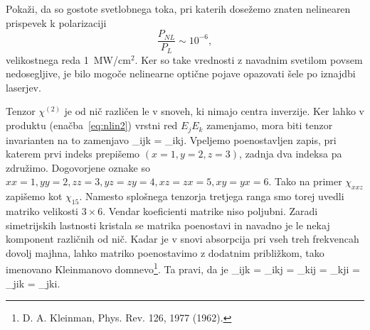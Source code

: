 \begin{definition}
Pokaži, da so gostote svetlobnega toka, pri katerih dosežemo znaten nelinearen 
prispevek k polarizaciji 
 $$\frac{P_{NL}}{P_L} \sim 10^{-6},$$
velikostnega reda 1~MW/cm$^2$. 
Ker so take vrednosti z navadnim svetilom povsem nedosegljive, je bilo mogoče nelinearne
optične pojave opazovati šele po iznajdbi laserjev.
\end{definition}
 
Tenzor $\chi^{(2)}$ je od nič različen le v snoveh, ki nimajo centra inverzije. 
Ker lahko v produktu (enačba~\ref{eq:nlin2}) vrstni red $E_j E_k$ zamenjamo, mora biti
tenzor invarianten na to zamenjavo
\beq
\chi_{ijk} = \chi_{ikj}.
\label{eq:chijk}
\eeq
Vpeljemo poenostavljen zapis, pri katerem prvi indeks prepišemo $(x = 1, y = 2, z = 3)$,
zadnja dva indeksa pa združimo. Dogovorjene oznake so $xx = 1, yy = 2, zz = 3, yz = zy =4, 
xz = zx =5, xy = yx = 6$. Tako na primer $\chi_{xxz}$ zapišemo kot $\chi_{15}$. Namesto
splošnega tenzorja tretjega ranga smo torej uvedli matriko velikosti $3\times6$. 
Vendar koeficienti matrike niso poljubni. Zaradi simetrijskih lastnosti kristala se matrika
poenostavi in navadno je le nekaj komponent različnih od nič. 
Kadar je v snovi absorpcija pri vseh treh frekvencah dovolj majhna, lahko matriko poenostavimo
z dodatnim približkom, tako imenovano  
 Kleinmanovo domnevo\footnote{D. A. Kleinman, Phys. Rev. 126, 1977 (1962).}.
Ta pravi, da je 
\beq
\chi_{ijk} = \chi_{ikj} = \chi_{kij} = \chi_{kji} = \chi_{jik} = \chi_{jki}.
\eeq
